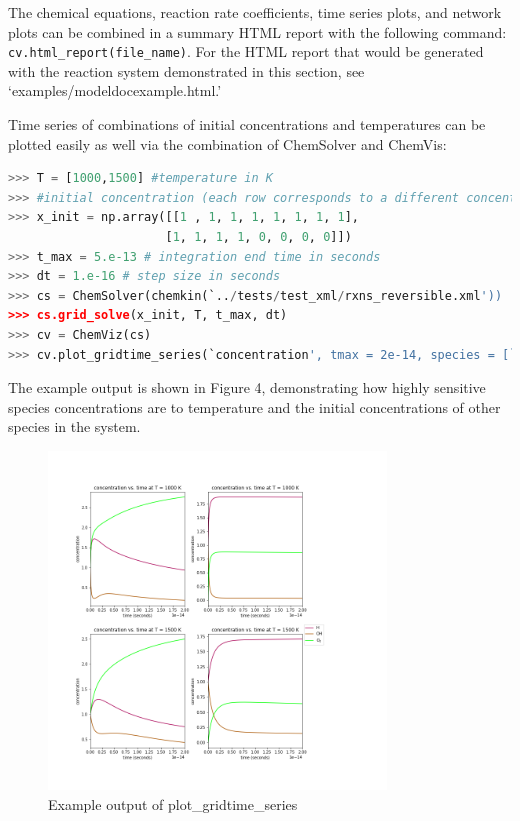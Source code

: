 \documentclass[12pt]{article}
\begin{document}
The chemical equations, reaction rate coefficients, time series plots, and network plots can be combined in a summary HTML report with the following command:\\
\texttt{cv.html\_report(file\_name)}. For the HTML report that would be generated with the reaction system demonstrated in this section, see `examples/modeldocexample.html.'

Time series of combinations of initial concentrations and temperatures can be plotted easily as well via the combination of ChemSolver and ChemVis:

\begin{lstlisting}[language = Python, basicstyle = \ttfamily,columns = fullflexible, showstringspaces = False]
>>> T = [1000,1500] #temperature in K
>>> #initial concentration (each row corresponds to a different concentration vector)
>>> x_init = np.array([[1 , 1, 1, 1, 1, 1, 1, 1],
                      [1, 1, 1, 1, 0, 0, 0, 0]]) 
>>> t_max = 5.e-13 # integration end time in seconds
>>> dt = 1.e-16 # step size in seconds
>>> cs = ChemSolver(chemkin(`../tests/test_xml/rxns_reversible.xml'))
>>> cs.grid_solve(x_init, T, t_max, dt)
>>> cv = ChemViz(cs)
>>> cv.plot_gridtime_series(`concentration', tmax = 2e-14, species = [`H', `OH', `O2'], outputfile = `modeldocfig4.png')
\end{lstlisting}

The example output is shown in Figure 4, demonstrating how highly sensitive species concentrations are to temperature and the initial concentrations of other species in the system. 

\begin{figure}[h!]
  \caption{Example output of plot\_gridtime\_series}
  \centering
  \includegraphics[width=0.8\textwidth]{../examples/modeldocfig4.png}
\end{figure} 
\end{document}
